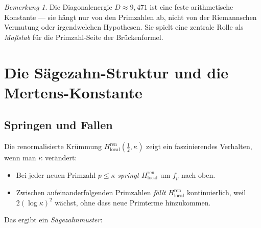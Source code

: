 \documentclass[11pt,a4paper]{article}
\theoremstyle{plain}
\theoremstyle{definition}
\theoremstyle{remark}
\newtheorem{remark}[theorem]{Bemerkung}
\newcommand{\Hren}{H_{\mathrm{local}}^{\mathrm{ren}}}
\begin{document}
	\begin{remark}
		Die Diagonalenergie $D \approx 9{,}471$ ist eine feste arithmetische Konstante
		--- sie h\"angt nur von den Primzahlen ab, nicht von der Riemannschen Vermutung
		oder irgendwelchen Hypothesen. Sie spielt eine zentrale Rolle als
		\emph{Ma\ss stab} f\"ur die Primzahl-Seite der Br\"uckenformel.
	\end{remark}
	
	
	
	\section{Die S\"agezahn-Struktur und die Mertens-Konstante}\label{sec:saegezahn}
	
	\subsection{Springen und Fallen}
	
	Die renormalisierte Kr\"ummung $\Hren(\frac{1}{2}, \kappa)$ zeigt ein
	faszinierendes Verhalten, wenn man $\kappa$ ver\"andert:
	
	\begin{itemize}
		\item Bei jeder neuen Primzahl $p \leq \kappa$ \emph{springt} $\Hren$
		um $f_p$ nach oben.
		\item Zwischen aufeinanderfolgenden Primzahlen \emph{f\"allt} $\Hren$
		kontinuierlich, weil $2(\log\kappa)^2$ w\"achst, ohne dass neue
		Primterme hinzukommen.
	\end{itemize}
	
	Das ergibt ein \emph{S\"agezahnmuster}:
	
	\begin{center}
	\end{center}
	
\end{document}
